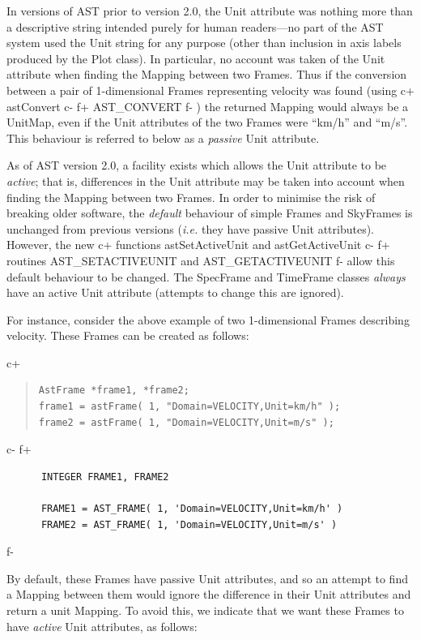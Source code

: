 \documentclass[twoside,11pt]{article}
\begin{document}
In versions of AST prior to version 2.0, the Unit attribute was nothing
more than a descriptive string intended purely for human readers---no
part of the AST system used the Unit string for any purpose (other than 
inclusion in axis labels produced by the Plot class). In particular, no
account was taken of the Unit attribute when finding the Mapping between
two Frames. Thus if the conversion between a pair of 1-dimensional Frames 
representing velocity was found (using
c+
astConvert
c-
f+
AST\_CONVERT
f-
) the returned Mapping would always be a UnitMap, even if the Unit
attributes of the two Frames were ``km/h'' and ``m/s''. This behaviour is
referred to below as a \emph{passive} Unit attribute.

As of AST version 2.0, a facility exists which allows the Unit attribute
to be \emph{active}; that is, differences in the 
Unit attribute may be taken into account when finding the Mapping between
two Frames. In order to minimise the risk of breaking older software, the 
\emph{default} behaviour of simple Frames and SkyFrames is unchanged from 
previous versions (\emph{i.e.} they have passive Unit attributes). However, 
the new 
c+
functions astSetActiveUnit and astGetActiveUnit
c-
f+
routines AST\_SETACTIVEUNIT and AST\_GETACTIVEUNIT
f-
allow this default behaviour to be changed. The SpecFrame and TimeFrame
classes \emph{always} have an active Unit attribute (attempts to change this 
are ignored).

For instance, consider the above example of two 1-dimensional Frames
describing velocity. These Frames can be created as follows:

c+
\begin{quote}
\small
\begin{verbatim}
AstFrame *frame1, *frame2;
frame1 = astFrame( 1, "Domain=VELOCITY,Unit=km/h" );
frame2 = astFrame( 1, "Domain=VELOCITY,Unit=m/s" );
\end{verbatim}
\normalsize
\end{quote}
c-
f+
\small
\begin{verbatim}
      INTEGER FRAME1, FRAME2

      FRAME1 = AST_FRAME( 1, 'Domain=VELOCITY,Unit=km/h' )
      FRAME2 = AST_FRAME( 1, 'Domain=VELOCITY,Unit=m/s' )

\end{verbatim}
\normalsize
f-

By default, these Frames have passive Unit attributes, and so an attempt
to find a Mapping between them would ignore the difference in their Unit
attributes and return a unit Mapping. To avoid this, we indicate that we
want these Frames to have \emph{active} Unit attributes, as follows:
\end{document}
